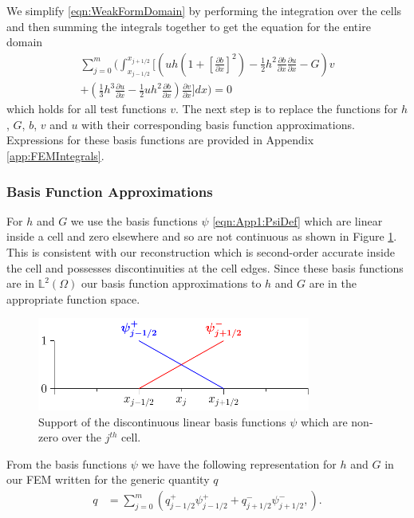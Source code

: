We simplify \eqref{eqn:WeakFormDomain} by performing the integration over the cells and then summing the integrals together to get the equation for the entire domain
\begin{multline}
\label{eq:elementwiseint}
 \sum_{j=0}^m \Bigg(  \int_{x_{j-1/2} }^{{x_{j+1/2}}} \Bigg[  \left( uh \left(1 + \left[\frac{\partial b}{\partial x}\right]^2 \right)  - \frac{1}{2}h^2\frac{\partial b}{\partial x}  \frac{\partial u }{\partial x}  -  G \right) v   \\ +  \left(\frac{1}{3}h^3  \frac{\partial {u}}{\partial x}    -     \frac{1}{2} uh^2\frac{\partial b}{\partial x}    \right) \frac{\partial v }{\partial x} \Bigg]dx \Bigg)  = 0
\end{multline}
which holds for all test functions $v$. The next step is to replace the functions for $h$, $G$, $b$, $v$ and $u$ with their corresponding basis function approximations. Expressions for these basis functions are provided in Appendix \ref{app:FEMIntegrals}.

\subsubsection{Basis Function Approximations}
For $h$ and $G$ we use the basis functions $\psi$ \eqref{eqn:App1:PsiDef} which are linear inside a cell and zero elsewhere and so are not continuous as shown in Figure \ref{fig:P1DiscBasis}. This is consistent with our reconstruction which is second-order accurate inside the cell and possesses discontinuities at the cell edges. Since these basis functions are in $\mathbb{L}^2(\Omega)$ our basis function approximations to $h$ and $G$ are in the appropriate function space.
\begin{figure}
	\centering
	\includegraphics[width=0.8\textwidth]{./chp3/figures/P1.pdf}
	\caption{Support of the discontinuous linear basis functions $\psi$ which are non-zero over the $j^{th}$ cell.}
	\label{fig:P1DiscBasis}
\end{figure}

From the basis functions $\psi$ we have the following representation for $h$ and $G$ in our FEM written for the generic quantity $q$
\begin{align}
\label{eqn:FEapproxtohG}
q &= \sum_{j=0}^m \left( q^+_{j-1/2}\psi^+_{j-1/2}  + q^-_{j+1/2}\psi^-_{j+1/2}, \right).
\end{align}

